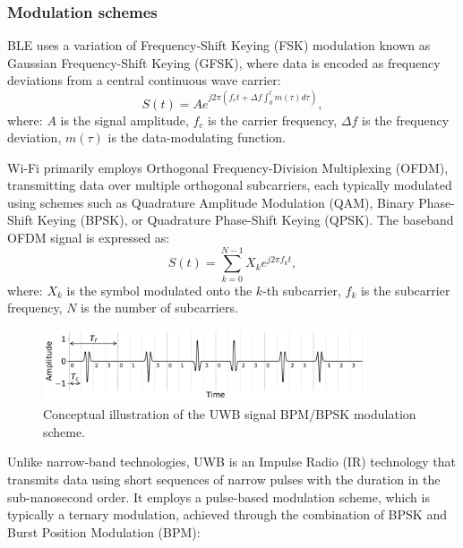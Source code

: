 \subsubsection{Modulation schemes}

BLE uses a variation of Frequency-Shift Keying (FSK) modulation known as Gaussian Frequency-Shift Keying (GFSK), where data is encoded as frequency deviations from a central continuous wave carrier:
\begin{equation}
S(t) = A e^{j 2\pi \left(f_c t + \Delta f \int_{0}^{t} m(\tau) d\tau\right)},
\end{equation}
where: $A$ is the signal amplitude, $f_c$ is the carrier frequency, $\Delta f$ is the frequency deviation, $m(\tau)$ is the data-modulating function. 

Wi-Fi primarily employs Orthogonal Frequency-Division Multiplexing (OFDM), transmitting data over multiple orthogonal subcarriers, each typically modulated using schemes such as Quadrature Amplitude Modulation (QAM), Binary Phase-Shift Keying (BPSK), or Quadrature Phase-Shift Keying (QPSK). The baseband OFDM signal is expressed as:
\begin{equation}
S(t) = \sum_{k=0}^{N-1} X_k e^{j 2 \pi f_k t},
\end{equation}
where: $X_k$ is the symbol modulated onto the $k$-th subcarrier, $f_k$ is the subcarrier frequency,
$N$ is the number of subcarriers.

\begin{figure}[tbh]
\includegraphics[width=0.85\textwidth]{Figures/theoretical_background/uwb_bpsk.pdf}
\centering
\caption{Conceptual illustration of the UWB signal BPM/BPSK modulation scheme.}
\label{fig:uwb-mod}
\end{figure}

Unlike narrow-band technologies, UWB is an Impulse Radio (IR) technology that transmits data using short sequences of narrow pulses with the duration in the sub-nanosecond order. It employs a pulse-based modulation scheme, which is typically a ternary modulation, achieved through the combination of BPSK and Burst Position Modulation (BPM):


